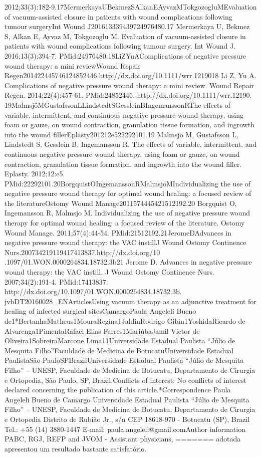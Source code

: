 \documentclass[numberinsection,times,10pt,spreadimages]{memoir}
\begin{document}
2012;33(3):182-9.17MermerkayaUBekmezSAlkanEAyvazMTokgozogluMEvaluation of
vacuum-assisted closure in patients with wound
complications following tumour surgeryInt Wound J201613339439724976480.17
Mermerkaya U, Bekmez S, Alkan E, Ayvaz M, Tokgozoglu M.
Evaluation of vacuum-assisted closure in patients with wound complications
following tumour surgery. Int Wound J. 2016;13(3):394-7.
PMid:24976480.18LiZYuAComplications of negative pressure wound therapy: a mini
reviewWound Repair
Regen201422445746124852446.http://dx.doi.org/10.1111/wrr.1219018 Li Z, Yu A.
Complications of negative pressure wound therapy: a
mini review. Wound Repair Regen. 2014;22(4):457-61. PMid:24852446.
http://dx.doi.org/10.1111/wrr.12190.
19MalmsjöMGustafssonLLindstedtSGessleinBIngemanssonRThe effects of variable,
intermittent, and continuous negative
pressure wound therapy, using foam or gauze, on wound contraction,
granulation tissue formation, and ingrowth into the wound
fillerEplasty201212e522292101.19 Malmsjö M, Gustafsson L, Lindstedt S, Gesslein
B, Ingemansson R.
The effects of variable, intermittent, and continuous negative pressure wound
therapy, using foam or gauze, on wound contraction, granulation tissue
formation, and ingrowth into the wound filler. Eplasty. 2012;12:e5.
PMid:22292101.20BorgquistOIngemanssonRMalmsjoMIndividualizing the use of
negative pressure wound therapy for
optimal wound healing: a focused review of the literatureOstomy Wound
Manage2011574445421512192.20 Borgquist O, Ingemansson R, Malmsjo M.
Individualizing the use of
negative pressure wound therapy for optimal wound healing: a focused review of
the literature. Ostomy Wound Manage. 2011;57(4):44-54.
PMid:21512192.21JeromeDAdvances in negative pressure wound therapy: the VAC
instillJ Wound Ostomy Continence Nurs.200734219119417413837.http://dx.doi.org/10
.1097/01.WON.0000264834.18732.3b21 Jerome D. Advances in negative pressure wound
therapy: the VAC
instill. J Wound Ostomy Continence Nurs. 2007;34(2):191-4. PMid:17413837.
http://dx.doi.org/10.1097/01.WON.0000264834.18732.3b.
jvbDT20160028\_{}ENArticlesUsing vacuum therapy as an adjunctive treatment for
healing of
infected surgical sitesCamargoPaula Angeleli Bueno
de1*BertanhaMatheus1MouraRegina1JaldinRodrigo Gibin1YoshidaRicardo de
Alvarenga1PimentaRafael Elias Farres1MariúbaJamil Victor de
Oliveira1SobreiraMarcone Lima11Universidade Estadual Paulista “Júlio de
Mesquita Filho”Faculdade de Medicina de
BotucatuUniversidade Estadual
PaulistaSão PauloSPBrazilUniversidade Estadual Paulista “Júlio de
Mesquita Filho” – UNESP, Faculdade de Medicina de Botucatu, Departamento de
Cirurgia e Ortopedia, São Paulo, SP, Brazil.Conflicts of interest: No conflicts
of interest declared concerning the
publication of this article.*Correspondence Paula Angeleli Bueno de Camargo
Universidade
Estadual Paulista “Júlio de Mesquita Filho” – UNESP, Faculdade de Medicina de
Botucatu, Departamento de Cirurgia e Ortopedia Distrito de Rubião Jr., s/n CEP
18618-970 - Botucatu (SP), Brazil Tel.: +55 (14) 3880-1447 E-mail:
paula.angeleli@gmail.comAuthor information PABC, RGJ, REFP and JVOM - Assistant
physicians,
=======
adotada apresentou um resultado bastante satisfatório.
\end{document}
